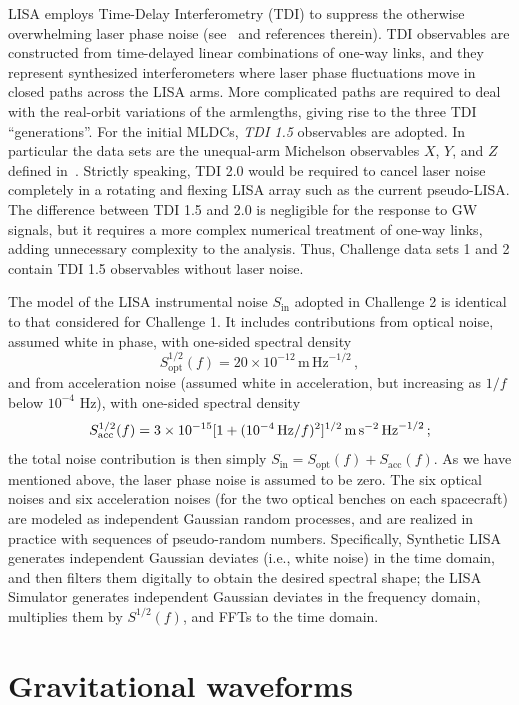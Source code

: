 \documentclass[12pt]{iopart}
\def\be{\begin{equation}}
\def\ee{\end{equation}}
\begin{document}
LISA employs Time-Delay Interferometry (TDI) to suppress the otherwise overwhelming laser phase noise (see~\cite{firstgen,modified,secondgen} and references therein). TDI observables are constructed from time-delayed linear combinations of one-way links, and they represent synthesized interferometers where laser phase fluctuations move in closed paths across the LISA arms. More complicated paths are required to deal with the real-orbit variations of the armlengths, giving rise to the three TDI ``generations''. For the initial MLDCs,  \emph{TDI 1.5} observables \cite{modified,secondgen} are adopted. In particular the data sets are the unequal-arm Michelson observables $X$, $Y$, and $Z$ defined in~\cite{secondgen}. Strictly speaking, TDI 2.0 would be required to cancel laser noise completely in a rotating and flexing LISA array such as the current pseudo-LISA. The difference between TDI 1.5 and 2.0 is negligible for the response to GW signals, but it requires a more complex  numerical treatment of one-way links, adding unnecessary complexity to the analysis. Thus, Challenge data sets 1 and 2 contain TDI 1.5 observables without laser noise.

The model of the LISA instrumental noise $S_\mathrm{in}$ adopted in Challenge 2 is identical to that considered for Challenge 1. It includes contributions from optical noise, assumed white in phase, with one-sided spectral density
\be
S_\mathrm{opt}^{1/2}(f) = 20 \times 10^{-12} \, \mathrm{m}\, \mathrm{Hz}^{-1/2}\,,
\ee
and from acceleration noise (assumed white in acceleration, but increasing as $1/f$ below $10^{-4}$ Hz), with one-sided spectral density 
\be
S_\mathrm{acc}^{1/2}(f) = 3 \times 10^{-15} [1 + (10^{-4}\,{\rm Hz}/f)^2]^{1/2}\, \mathrm{m}\, \mathrm{s}^{-2}\, \mathrm{Hz}^{-1/2}\,;
\ee
the total noise contribution is then simply $S_\mathrm{in} = S_\mathrm{opt}(f) + S_\mathrm{acc}(f)$. As we have mentioned above, the laser phase noise is assumed to be zero. The six optical noises and six acceleration noises (for the two optical benches on each spacecraft) are modeled as independent Gaussian random processes, and are realized in practice with sequences of pseudo-random numbers. Specifically, Synthetic LISA generates independent Gaussian deviates (i.e., white noise) in the time domain, and then filters them digitally to obtain the desired spectral shape; the LISA Simulator generates independent Gaussian deviates in the frequency domain, multiplies them by $S^{1/2}(f)$, and FFTs to the time domain.

\section{Gravitational waveforms}
\end{document}
